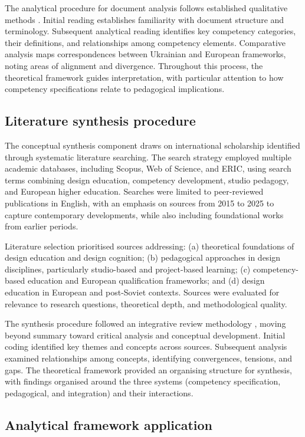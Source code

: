 \documentclass[ed]{acnsart}
\begin{document}
	The analytical procedure for document analysis follows established qualitative methods \cite{Bowen2009}. Initial reading establishes familiarity with document structure and terminology. Subsequent analytical reading identifies key competency categories, their definitions, and relationships among competency elements. Comparative analysis maps correspondences between Ukrainian and European frameworks, noting areas of alignment and divergence. Throughout this process, the theoretical framework guides interpretation, with particular attention to how competency specifications relate to pedagogical implications.
	
	\subsection{Literature synthesis procedure}
	
	The conceptual synthesis component draws on international scholarship identified through systematic literature searching. The search strategy employed multiple academic databases, including Scopus, Web of Science, and ERIC, using search terms combining design education, competency development, studio pedagogy, and European higher education. Searches were limited to peer-reviewed publications in English, with an emphasis on sources from 2015 to 2025 to capture contemporary developments, while also including foundational works from earlier periods.
	
	Literature selection prioritised sources addressing: (a) theoretical foundations of design education and design cognition; (b) pedagogical approaches in design disciplines, particularly studio-based and project-based learning; (c) competency-based education and European qualification frameworks; and (d) design education in European and post-Soviet contexts. Sources were evaluated for relevance to research questions, theoretical depth, and methodological quality.
	
	The synthesis procedure followed an integrative review methodology \cite{Torraco2005}, moving beyond summary toward critical analysis and conceptual development. Initial coding identified key themes and concepts across sources. Subsequent analysis examined relationships among concepts, identifying convergences, tensions, and gaps. The theoretical framework provided an organising structure for synthesis, with findings organised around the three systems (competency specification, pedagogical, and integration) and their interactions.
	
	\subsection{Analytical framework application}
	
\end{document}
